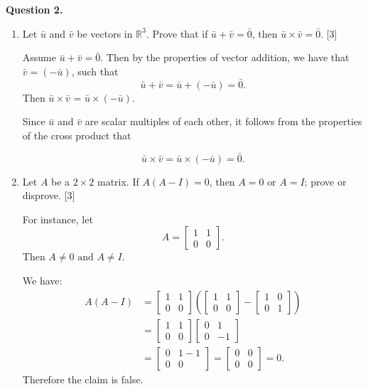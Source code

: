 \documentclass[11pt]{article}
\begin{document}
\newpage

\textbf{Question 2.}
\begin{enumerate}[label=\alph*)]
    \item Let \(\bar{u}\) and \(\bar{v}\) be vectors in \(\mathbb{R}^3\). Prove that if \(\bar{u}+\bar{v} = \bar{0}\), then \(\bar{u}\times\bar{v} = \bar{0}\). \hfill [3]
    
    \color{blue}
    Assume \(\bar{u}+\bar{v} = \bar{0}\). Then by the properties of vector addition, we have that \(\bar{v} = (-\bar{u})\), such that
    \[
        \bar{u} + \bar{v} = \bar{u} + (-\bar{u}) = \bar{0}.
    \]
    Then \(\bar{u}\times\bar{v}\) = \(\bar{u}\times(-\bar{u})\).

    Since \(\bar{u}\) and \(\bar{v}\) are scalar multiples of each other, it follows from the properties of the cross product that

    \[
            \bar{u}\times\bar{v} = \bar{u}\times(-\bar{u}) = \bar{0}.    
    \]
    \color{black}
    \item Let \(A\) be a \(2\times2\) matrix. If \(A(A-I) = 0\), then \(A = 0 \text{ or } A = I\); prove or disprove. \hfill [3]
    
    \color{blue}
    For instance, let
    \[
        A = \begin{bmatrix}
            1 & 1\\
            0 & 0
        \end{bmatrix}.
    \]
    Then \(A \neq 0 \text{ and } A \neq I\).

    We have:
        \[
        \begin{aligned}
            A(A-I) &= \begin{bmatrix}
            1 & 1\\
            0 & 0
        \end{bmatrix}
        \left(\begin{bmatrix}
            1 & 1\\
            0 & 0
        \end{bmatrix} - \begin{bmatrix}
            1 & 0\\
            0 & 1
        \end{bmatrix}\right)\\  
        &=\begin{bmatrix}
            1 & 1\\
            0 & 0
        \end{bmatrix}\begin{bmatrix}
            0 & 1\\
            0 & -1
        \end{bmatrix}\\
        &= \begin{bmatrix}
            0 & 1-1\\
            0 & 0
        \end{bmatrix} = \begin{bmatrix}
            0 & 0\\ 0&0
        \end{bmatrix} = 0.
        \end{aligned} 
    \]
    Therefore the claim is false.


\end{enumerate}
\end{document}
